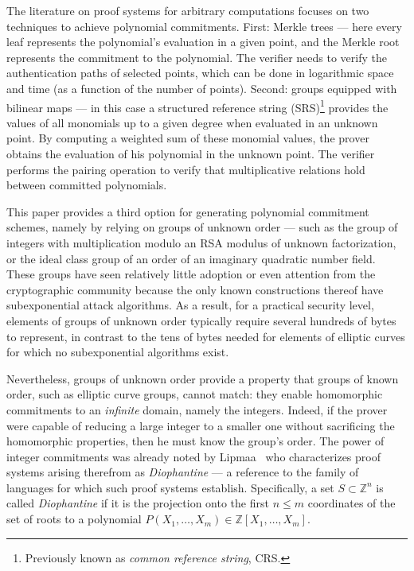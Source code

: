The literature on proof systems for arbitrary computations focuses on two techniques to achieve polynomial commitments. First: Merkle trees --- here every leaf represents the polynomial's evaluation in a given point, and the Merkle root represents the commitment to the polynomial. The verifier needs to verify the authentication paths of selected points, which can be done in logarithmic space and time (as a function of the number of points). Second: groups equipped with bilinear maps --- in this case a structured reference string (SRS)\footnote{Previously known as \emph{common reference string}, CRS.} provides the values of all monomials up to a given degree when evaluated in an unknown point. By computing a weighted sum of these monomial values, the prover obtains the evaluation of his polynomial in the unknown point. The verifier performs the pairing operation to verify that multiplicative relations hold between committed polynomials.

This paper provides a third option for generating polynomial commitment schemes, namely by relying on groups of unknown order --- such as the group of integers with multiplication modulo an RSA modulus of unknown factorization, or the ideal class group of an order of an imaginary quadratic number field. These groups have seen relatively little adoption or even attention from the cryptographic community because the only known constructions thereof have subexponential attack algorithms. As a result, for a practical security level, elements of groups of unknown order typically require several hundreds of bytes to represent, in contrast to the tens of bytes needed for elements of elliptic curves for which no subexponential algorithms exist. 

Nevertheless, groups of unknown order provide a property that groups of known order, such as elliptic curve groups, cannot match: they enable homomorphic  commitments to an \emph{infinite} domain, namely the integers. Indeed, if the prover were capable of reducing a large integer to a smaller one without sacrificing the homomorphic properties, then he must know the group's order. The power of integer commitments was already noted by Lipmaa~\cite{AC:Lipmaa03b} who characterizes proof systems arising therefrom as \emph{Diophantine} --- a reference to the family of languages for which such proof systems establish. Specifically, a set $S \subset \mathbb{Z}^n$ is called \emph{Diophantine} if it is the projection onto the first $n \leq m$ coordinates of the set of roots to a polynomial $P(X_1, \ldots, X_m) \in \mathbb{Z}[X_1, \ldots, X_m]$.%

